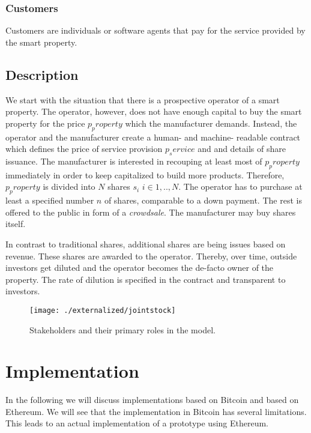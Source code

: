 \subsubsection{Customers}

Customers are individuals or software agents that pay for the service provided by the smart property.

\subsection{Description}

We start with the situation that there is a prospective operator of a smart property. The operator, however, does not have enough capital to buy the smart property for the price $p_property$ which the manufacturer demands. Instead, the operator and the manufacturer create a human- and machine- readable contract which defines the price of service provision $p_service$ and and details of share issuance. The manufacturer is interested in recouping at least most of $p_property$ immediately in order to keep capitalized to build more products. Therefore, $p_property$ is divided into $N$ shares $s_i$ $i \in {1,..,N}$. The operator has to purchase at least a specified number $n$ of shares, comparable to a down payment. The rest is offered to the public in form of a \emph{crowdsale}. The manufacturer may buy shares itself. 

In contrast to traditional shares, additional shares are being issues based on revenue. These shares are awarded to the operator. Thereby, over time, outside investors get diluted and the operator becomes the de-facto owner of the property. The rate of dilution is specified in the contract and transparent to investors.

\begin{figure}[!t]
    \centering
    \texttt{[image: ./externalized/jointstock]}
    \caption{Stakeholders and their primary roles in the model.}
    \label{fig:smartproperty}
  \end{figure}

\section{Implementation}

In the following we will discuss implementations based on Bitcoin and based on Ethereum. We will see that the implementation in Bitcoin has several limitations. This leads to an actual implementation of a prototype using Ethereum.

